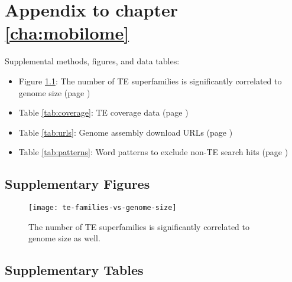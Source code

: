 \chapter{Appendix to chapter \ref{cha:mobilome}}

Supplemental methods, figures, and data tables:

\begin{itemize}
	\item Figure \ref{fig:te-families-vs-genome-size}: The number of TE superfamilies is significantly correlated to genome size (page \pageref{fig:te-families-vs-genome-size})
\end{itemize}

\begin{itemize}
	\item Table \ref{tab:coverage}: TE coverage data (page \pageref{tab:coverage})
	\item Table \ref{tab:urls}: Genome assembly download URLs (page \pageref{tab:urls})
	\item Table \ref{tab:patterns}: Word patterns to exclude non-TE search hits (page \pageref{tab:patterns})
\end{itemize}

\section{Supplementary Figures}

\begin{figure}[h]
\centering
\texttt{[image: te-families-vs-genome-size]}
\caption[The number of TE superfamilies is significantly correlated to
genome size]{The number of TE superfamilies is significantly correlated to
genome size as well.}
\label{fig:te-families-vs-genome-size}
\end{figure}


\clearpage

\section{Supplementary Tables}

